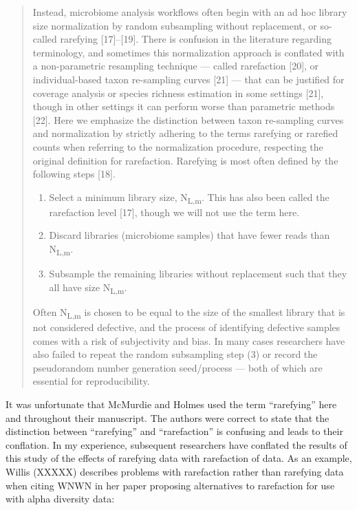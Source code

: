 \documentclass[
]{article}
\providecommand{\tightlist}{%
  \setlength{\itemsep}{0pt}\setlength{\parskip}{0pt}}
\begin{document}
\begin{quote}
Instead, microbiome analysis workflows often begin with an ad hoc
library size normalization by random subsampling without replacement, or
so-called rarefying {[}17{]}--{[}19{]}. There is confusion in the
literature regarding terminology, and sometimes this normalization
approach is conflated with a non-parametric resampling technique ---
called rarefaction {[}20{]}, or individual-based taxon re-sampling
curves {[}21{]} --- that can be justified for coverage analysis or
species richness estimation in some settings {[}21{]}, though in other
settings it can perform worse than parametric methods {[}22{]}. Here we
emphasize the distinction between taxon re-sampling curves and
normalization by strictly adhering to the terms rarefying or rarefied
counts when referring to the normalization procedure, respecting the
original definition for rarefaction. Rarefying is most often defined by
the following steps {[}18{]}.

\begin{enumerate}
\def\labelenumi{\arabic{enumi}.}
\tightlist
\item
  Select a minimum library size, N\textsubscript{L,m}. This has also
  been called the rarefaction level {[}17{]}, though we will not use the
  term here.
\item
  Discard libraries (microbiome samples) that have fewer reads than
  N\textsubscript{L,m}.
\item
  Subsample the remaining libraries without replacement such that they
  all have size N\textsubscript{L,m}.
\end{enumerate}

Often N\textsubscript{L,m} is chosen to be equal to the size of the
smallest library that is not considered defective, and the process of
identifying defective samples comes with a risk of subjectivity and
bias. In many cases researchers have also failed to repeat the random
subsampling step (3) or record the pseudorandom number generation
seed/process --- both of which are essential for reproducibility.
\end{quote}

It was unfortunate that McMurdie and Holmes used the term ``rarefying''
here and throughout their manuscript. The authors were correct to state
that the distinction between ``rarefying'' and ``rarefaction'' is
confusing and leads to their conflation. In my experience, subsequent
researchers have conflated the results of this study of the effects of
rarefying data with rarefaction of data. As an example, Willis (XXXXX)
describes problems with rarefaction rather than rarefying data when
citing WNWN in her paper proposing alternatives to rarefaction for use
with alpha diversity data:
\end{document}

